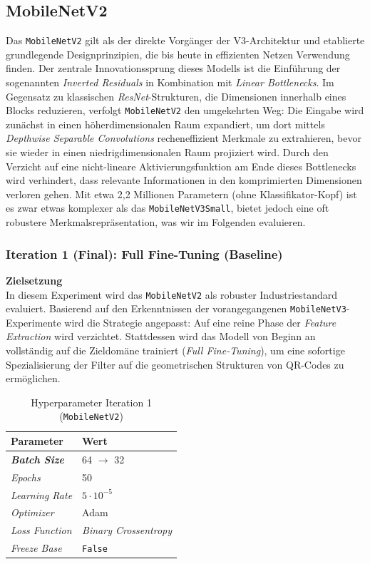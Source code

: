 \documentclass[
    a4paper,        %
    11pt,           %
    ngerman,        %
    parskip=half,   %
    listof=totoc,   %
    bibliography=totoc %
]{scrartcl}
\begin{document}
\subsection{MobileNetV2}

Das \texttt{MobileNetV2} gilt als der direkte Vorgänger der V3-Architektur und etablierte grundlegende Designprinzipien, die bis heute in effizienten Netzen Verwendung finden. Der zentrale Innovationssprung dieses Modells ist die Einführung der sogenannten \textit{Inverted Residuals} in Kombination mit \textit{Linear Bottlenecks}. Im Gegensatz zu klassischen \textit{ResNet}-Strukturen, die Dimensionen innerhalb eines Blocks reduzieren, verfolgt \texttt{MobileNetV2} den umgekehrten Weg: Die Eingabe wird zunächst in einen höherdimensionalen Raum expandiert, um dort mittels \textit{Depthwise Separable Convolutions} recheneffizient Merkmale zu extrahieren, bevor sie wieder in einen niedrigdimensionalen Raum projiziert wird. Durch den Verzicht auf eine nicht-lineare Aktivierungsfunktion am Ende dieses Bottlenecks wird verhindert, dass relevante Informationen in den komprimierten Dimensionen verloren gehen. Mit etwa 2,2 Millionen Parametern (ohne Klassifikator-Kopf) ist es zwar etwas komplexer als das \texttt{MobileNetV3Small}, bietet jedoch eine oft robustere Merkmalsrepräsentation, was wir im Folgenden evaluieren.

\subsubsection{Iteration 1 (Final): Full Fine-Tuning (Baseline)}

\textbf{Zielsetzung} \\
In diesem Experiment wird das \texttt{MobileNetV2} als robuster Industriestandard evaluiert. Basierend auf den Erkenntnissen der vorangegangenen \texttt{MobileNetV3}-Experimente wird die Strategie angepasst: Auf eine reine Phase der \textit{Feature Extraction} wird verzichtet. Stattdessen wird das Modell von Beginn an vollständig auf die Zieldomäne trainiert (\textit{Full Fine-Tuning}), um eine sofortige Spezialisierung der Filter auf die geometrischen Strukturen von QR-Codes zu ermöglichen.

\begin{table}[H]
    \centering
    \caption{Hyperparameter Iteration 1 (\texttt{MobileNetV2})}
    \label{tab:mnetv2_hyperparams_iter1}
    \begin{tabular}{ll}
        \toprule
        \textbf{Parameter} & \textbf{Wert} \\
        \midrule
        \textbf{\textit{Batch Size}} & 64 $\rightarrow$ 32 \\
        \textit{Epochs} & 50 \\
        \textit{Learning Rate} & $5 \cdot 10^{-5}$ \\
        \textit{Optimizer} & Adam \\
        \textit{Loss Function} & \textit{Binary Crossentropy} \\
        \textit{Freeze Base} & \texttt{False} \\
        \bottomrule
    \end{tabular}
\end{table}
\end{document}
